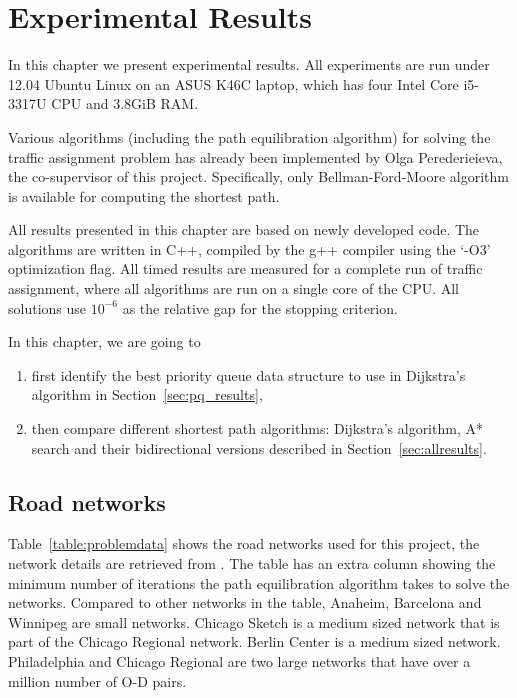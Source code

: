 \chapter{Experimental Results}\label{chap:results}
In this chapter we present experimental results.
All experiments are run under 12.04 Ubuntu Linux on an ASUS K46C laptop,
which has four Intel Core i5-3317U CPU and 3.8GiB RAM.

Various algorithms (including the path equilibration algorithm) for solving
the traffic assignment problem has already been implemented by Olga Perederieieva, the co-supervisor of this project.
Specifically, only Bellman-Ford-Moore algorithm is available for computing the shortest path. 

All results presented in this chapter are based on newly developed code.
The algorithms are written in C++, compiled by the g++ compiler using the `-O3' optimization flag.
All timed results are measured for a complete run of traffic assignment,
where all algorithms are run on a single core of the CPU.
All solutions use $10^{-6}$ as the relative gap for the stopping criterion.

In this chapter, we are going to
\begin{enumerate}
    \item first identify the best priority queue data structure to use in Dijkstra's algorithm in Section~\ref{sec:pq_results},
    \item then compare different shortest path algorithms: Dijkstra's algorithm, A* search and their bidirectional versions described in Section~\ref{sec:allresults}.
\end{enumerate}

\section{Road networks}

Table~\ref{table:problemdata} shows the road networks used for this project, the network details are retrieved from \citet{ProblemData}.
The table has an extra column showing the minimum number of iterations the path equilibration algorithm takes to solve the networks.
Compared to other networks in the table,
Anaheim, Barcelona and Winnipeg are small networks.
Chicago Sketch is a medium sized network that is part of the Chicago Regional network.
Berlin Center is a medium sized network.
Philadelphia and Chicago Regional are two large networks that have over a million number of O-D pairs.

